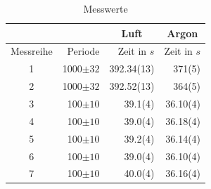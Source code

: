 \documentclass[11pt,a4paper]{article}
\begin{document}
\begin{table}[h]
\centering
\renewcommand\thetable{T1}
\caption{Messwerte}
\vspace{11pt}
\begin{tabular}{crrr}
\multicolumn{2}{c}{}&\multicolumn{1}{c}{Luft} & \multicolumn{1}{c}{Argon}\\
\toprule
Messreihe & Periode & Zeit in $s$ & Zeit in $s$\\
\midrule
1&1000$\pm32$ & 392.34(13) & 371(5) \\ 
2&1000$\pm32$ & 392.52(13) & 364(5) \\ 
\hline
3&100$\pm10$ & 39.1(4) & 36.10(4) \\
4&100$\pm10$ & 39.0(4) & 36.18(4) \\
5&100$\pm10$ & 39.2(4) & 36.14(4) \\
6&100$\pm10$ & 39.0(4) & 36.10(4) \\
7&100$\pm10$ & 40.0(4) & 36.16(4) \\ 
\bottomrule
\end{tabular}
\label{tab:B1}
\end{table}

\phantom{lol}
\end{document}
